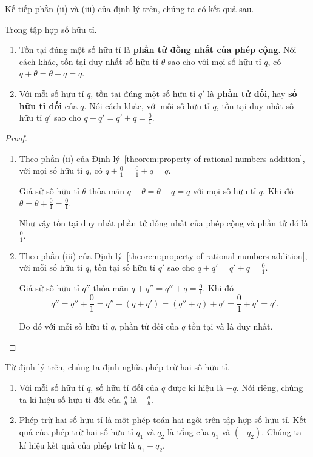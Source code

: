 Kế tiếp phần (ii) và (iii) của định lý trên, chúng ta có kết quả sau.
\begin{theorem}\label{theorem:rational-numbers-additive-identity-and-additive-inverse}
	Trong tập hợp số hữu tỉ.
	\begin{enumerate}[label={(\roman*)}]
		\item Tồn tại đúng một số hữu tỉ là \textbf{phần tử đồng nhất của phép cộng}. Nói cách khác, tồn tại duy nhất số hữu tỉ $\theta$ sao cho với mọi số hữu tỉ $q$, có $q + \theta = \theta + q = q$.
		\item Với mỗi số hữu tỉ $q$, tồn tại đúng một số hữu tỉ $q'$ là \textbf{phần tử đối}, hay \textbf{số hữu tỉ đối} của $q$. Nói cách khác, với mỗi số hữu tỉ $q$, tồn tại duy nhất số hữu tỉ $q'$ sao cho $q + q' = q' + q = \frac{0}{1}$.
	\end{enumerate}
\end{theorem}

\begin{proof}
	\begin{enumerate}[label={(\roman*)}]
		\item Theo phần (ii) của Định lý~\ref{theorem:property-of-rational-numbers-addition}, với mọi số hữu tỉ $q$, có $q + \frac{0}{1} = \frac{0}{1} + q = q$.

		      Giả sử số hữu tỉ $\theta$ thỏa mãn $q + \theta = \theta + q = q$ với mọi số hữu tỉ $q$. Khi đó $\theta = \theta + \frac{0}{1} = \frac{0}{1}$.

		      Như vậy tồn tại duy nhất phần tử đồng nhất của phép cộng và phần tử đó là $\frac{0}{1}$.
		\item Theo phần (iii) của Định lý~\ref{theorem:property-of-rational-numbers-addition}, với mỗi số hữu tỉ $q$, tồn tại số hữu tỉ $q'$ sao cho $q + q' = q' + q = \frac{0}{1}$.

		      Giả sử số hữu tỉ $q''$ thỏa mãn $q + q'' = q'' + q = \frac{0}{1}$. Khi đó
		      \[
			      q'' = q'' + \frac{0}{1} = q'' + (q + q') = (q'' + q) + q' = \frac{0}{1} + q' = q'.
		      \]

		      Do đó với mỗi số hữu tỉ $q$, phần tử đối của $q$ tồn tại và là duy nhất.
	\end{enumerate}
\end{proof}

Từ định lý trên, chúng ta định nghĩa phép trừ hai số hữu tỉ.
\begin{definition}
	\begin{enumerate}[label={(\roman*)}]
		\item Với mỗi số hữu tỉ $q$, số hữu tỉ đối của $q$ được kí hiệu là $-q$. Nói riêng, chúng ta kí hiệu số hữu tỉ đối của $\frac{a}{b}$ là $-\frac{a}{b}$.
		\item Phép trừ hai số hữu tỉ là một phép toán hai ngôi trên tập hợp số hữu tỉ. Kết quả của phép trừ hai số hữu tỉ $q_{1}$ và $q_{2}$ là tổng của $q_{1}$ và $(-q_{2})$. Chúng ta kí hiệu kết quả của phép trừ là $q_{1} - q_{2}$.
	\end{enumerate}
\end{definition}

